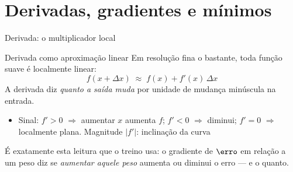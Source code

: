 \documentclass[aspectratio=169, 11pt]{beamer}
\begin{document}
\section{Derivadas, gradientes e mínimos}

\begin{frame}{Derivada: o multiplicador local}
  \begin{defbox}{Derivada como aproximação linear}
    Em resolução fina o bastante, toda função suave é localmente linear:
    \[
      f(x + \Delta x) \;\approx\; f(x) + f'(x)\, \Delta x
    \]
    A derivada diz \emph{quanto a saída muda} por unidade de mudança minúscula na
    entrada.
  \end{defbox}

  \begin{itemize}\setlength{\itemsep}{0.2ex}
    \item Sinal: $f' > 0$ $\Rightarrow$ aumentar $x$ aumenta $f$;\;
          $f' < 0$ $\Rightarrow$ diminui;\; $f' = 0$ $\Rightarrow$ localmente plana.
          Magnitude $|f'|$: inclinação da curva
  \end{itemize}

  \begin{ideiabox}
    É exatamente esta leitura que o treino usa: o gradiente de $\erro$ em relação
    a um peso diz se \emph{aumentar aquele peso} aumenta ou diminui o erro — e o
    quanto.
  \end{ideiabox}
\end{frame}
\end{document}
